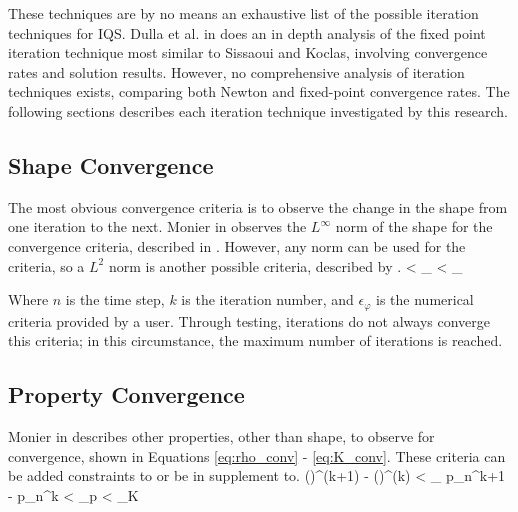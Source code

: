 These techniques are by no means an exhaustive list of the possible iteration techniques for IQS. Dulla et al. in \cite{Dulla2008} does an in depth analysis of the fixed point iteration technique most similar to Sissaoui and Koclas, involving convergence rates and solution results.  However, no comprehensive analysis of iteration techniques exists, comparing both Newton and fixed-point convergence rates.  The following sections describes each iteration technique investigated by this research.

\subsection{Shape Convergence}

The most obvious convergence criteria is to observe the change in the shape from one iteration to the next.  Monier in \cite{Monier_diss} observes the $L^{\infty}$ norm of the shape for the convergence criteria, described in .  However, any norm can be used for the criteria, so a $L^2$ norm is another possible criteria, described by .
\be
{} < \epsilon_{\varphi}
\label{eq:shape_Linf}
\ee 
\be
{} < \epsilon_{\varphi}
\label{eq:shape_L2}
\ee 

Where $n$ is the time step, $k$ is the iteration number, and $\epsilon_{\varphi}$ is the numerical criteria provided by a user. Through testing, iterations do not always converge this criteria; in this circumstance, the maximum number of iterations is reached.


\subsection{Property Convergence}

Monier in \cite{Monier_diss} describes other properties, other than shape, to observe for convergence, shown in Equations \eqref{eq:rho_conv} - \eqref{eq:K_conv}.  These criteria can be added constraints to  or be in supplement to.
\be
\left(\frac{\rho}{\Lambda}\right)^{(k+1)} - \left(\frac{\rho}{\Lambda}\right)^{(k)} < \epsilon_{\rho}
\label{eq:rho_conv}
\ee
\be 
p_n^{k+1} - p_n^{k} < \epsilon_p
\label{eq:p_conv}
\ee
\be 
{} < \epsilon_K
\label{eq:K_conv}
\ee

